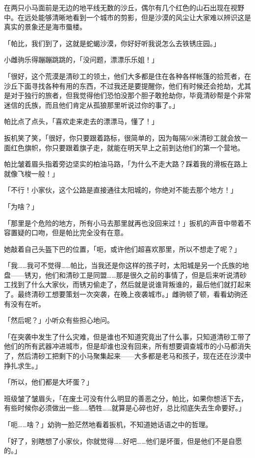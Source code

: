 在两只小马面前是无边的地平线无数的沙丘，偶尔有几个红色的山石出现在视野中。在远处能够清晰地看到一个城市的剪影，但是沙漠的风尘让大家难以辨识这是真实的景象还是海市蜃楼。

「帕比，我们到了，这就是蛇蝎沙漠，你好好听我说怎么去铁锈庄园。」

小雌驹乐得蹦蹦跳跳的，「没问题，漂漂乐乐姐！」

「很好，这个荒漠是清砂工的领土，他们大多都是住在各种各样帐篷的拾荒者，在沙丘下面寻找各种有用的东西，不过我还是要提醒你，他们有时候还会抢劫，尤其是对于独行的旅者，但我觉得他们恐怕没那个胆子敢抢劫你，毕竟清砂帮是个非常迷信的氏族，而且他们肯定从孤狼那里听说过你的事了。」

帕比点了点头，「喜欢走来走去的漂漂马，懂了！」

扳机笑了笑，「很好，你只要跟着路标，很简单的，因为每隔50米清砂工就会放一面红色旗帜，你只要跟着旗子走，就能在明天早上之前到达他们的第一个营地。

帕比皱着眉头指着旁边坚实的柏油马路，「为什么不走大路？踩着我的滑板在路上就像飞梭一般！」

「不行！小家伙，这个公路是直接通往太阳城的，你绝对不能去那个地方！」

「为啥？」

「那里是个危险的地方，所有小马去那里就再也没回来过！」扳机的声音中带着不容置疑的口吻，但是帕比完全没有在意。

她敲着自己头盔下巴的位置，「呃，或许他们超喜欢那里，所以不想走了呢？」

「我……我可不觉得……帕比，当我还是你这样的孩子时，太阳城是另一个氏族的地盘——锈刃，他们和清砂工是同盟……那是很久之前的事情了，但是后来听说清砂工找到了什么大家伙，而锈刃偷走了，然后就是说谁背叛谁的，最后他们就打起来了。最终清砂工想要策划一次突袭，在晚上夜袭城市。」雌驹顿了顿，看看幼驹还有没有在听。

「然后呢？」小听众有些担心地问。

「在突袭中发生了什么灾难，但是谁也不知道究竟出了什么事，只知道清砂工带了他们的所有武器冲进城市，但是却谁也没有回来，所有想要调查城市的小马都消失了，然后清砂工把剩下的小马聚集起来——大多都是老马和孩子，现在还在沙漠中挣扎求生。」

「所以，他们都是大坏蛋？」

班级皱了皱眉头，「在废土可没有什么明显的善恶之分，帕比，如果你想活下去，有些时候你必须做出一些……牺牲……就算是心碎也好，总比彻底失去生命要好。」

「呃……啥？」幼驹一脸茫然地看着扳机，不知道她话语之中的哲理。

「好了，别瞎想了小家伙，你就觉得……好吧……他们是坏蛋，但是他们不是自愿的。」

